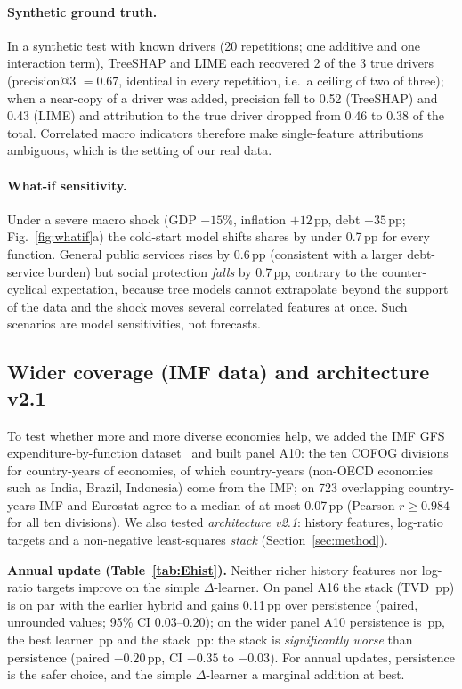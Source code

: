 \paragraph{Synthetic ground truth.} In a synthetic test with known drivers (20 repetitions; one additive and one interaction term), TreeSHAP and LIME each recovered 2 of the 3 true drivers (precision@3 $=0.67$, identical in every repetition, i.e.\ a ceiling of two of three); when a near-copy of a driver was added, precision fell to 0.52 (TreeSHAP) and 0.43 (LIME) and attribution to the true driver dropped from 0.46 to 0.38 of the total. Correlated macro indicators therefore make single-feature attributions ambiguous, which is the setting of our real data.
\paragraph{What-if sensitivity.} Under a severe macro shock (GDP $-15\%$, inflation $+12$\,pp, debt $+35$\,pp; Fig.~\ref{fig:whatif}a) the cold-start model shifts shares by under 0.7\,pp for every function. General public services rises by 0.6\,pp (consistent with a larger debt-service burden) but social protection \emph{falls} by 0.7\,pp, contrary to the counter-cyclical expectation, because tree models cannot extrapolate beyond the support of the data and the shock moves several correlated features at once. Such scenarios are model sensitivities, not forecasts.

\subsection{Wider coverage (IMF data) and architecture v2.1}\label{sec:v21}
To test whether more and more diverse economies help, we added the IMF GFS expenditure-by-function dataset~\cite{imf_gfs} and built panel A10: the ten COFOG divisions for \NTenRows{} country-years of \NTenEcon{} economies, of which \NTenImf{} country-years (non-OECD economies such as India, Brazil, Indonesia) come from the IMF; on 723 overlapping country-years IMF and Eurostat agree to a median of at most 0.07\,pp (Pearson $r\ge0.984$ for all ten divisions). We also tested \emph{architecture v2.1}: history features, log-ratio targets and a non-negative least-squares \emph{stack} (Section~\ref{sec:method}).

\textbf{Annual update (Table~\ref{tab:Ehist}).} Neither richer history features nor log-ratio targets improve on the simple $\Delta$-learner. On panel A16 the stack (TVD \HistStackSixteen\,pp) is on par with the earlier hybrid and gains 0.11\,pp over persistence (paired, unrounded values; 95\% CI 0.03--0.20); on the wider panel A10 persistence is \HistPersistTen\,pp, the best learner \HistBestTen\,pp and the stack \HistStackTen\,pp: the stack is \emph{significantly worse} than persistence (paired $-0.20$\,pp, CI $-0.35$ to $-0.03$). For annual updates, persistence is the safer choice, and the simple $\Delta$-learner a marginal addition at best.

